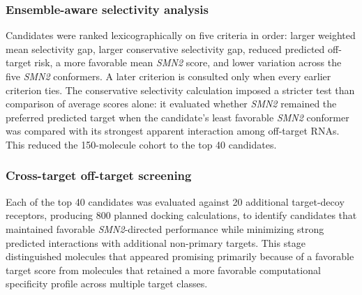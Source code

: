 \documentclass[journal]{IEEEtran}
\begin{document}
\subsubsection{Ensemble-aware selectivity analysis}
\label{sec:ensemble}
Candidates were ranked lexicographically on five criteria in order:
larger weighted mean selectivity gap, larger conservative selectivity
gap, reduced predicted off-target risk, a more favorable mean
\textit{SMN2} score, and lower variation across the five \textit{SMN2}
conformers. A
later criterion is consulted only when every earlier criterion ties. The
conservative selectivity calculation imposed a stricter test than
comparison of average scores alone: it evaluated whether \textit{SMN2}
remained the preferred predicted target when the candidate's least
favorable \textit{SMN2} conformer was compared with its strongest
apparent interaction among off-target RNAs. This reduced the
150-molecule cohort to the top 40 candidates.

\subsubsection{Cross-target off-target screening}
Each of the top 40 candidates was evaluated against 20 additional
target-decoy receptors, producing 800 planned docking calculations, to
identify candidates that maintained favorable \textit{SMN2}-directed
performance while minimizing strong predicted interactions with
additional non-primary targets. This stage distinguished molecules that
appeared promising primarily because of a favorable target score from
molecules that retained a more favorable computational specificity
profile across multiple target classes.
\end{document}
